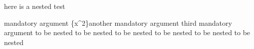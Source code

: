 here is a nested test
\begin{one}{mandatory argument}%
	{\{x^2\}another mandatory argument}%
	{third mandatory argument}
	to be nested to be nested
	to be nested to be nested
	to be nested to be nested
\end{one}
